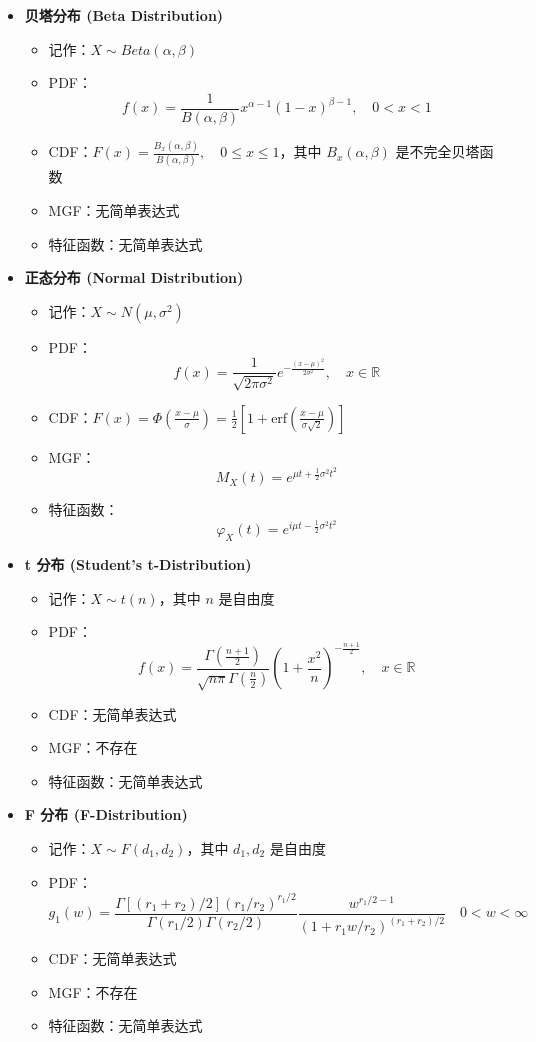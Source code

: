 \begin{itemize}
    \item \textbf{贝塔分布 (Beta Distribution)}
    \begin{itemize}
        \item 记作：$X \sim Beta(\alpha, \beta)$
        \item PDF：$$f(x) = \frac{1}{B(\alpha, \beta)} x^{\alpha-1} (1-x)^{\beta-1}, \quad 0 < x < 1$$
        \item CDF：$F(x) = \frac{B_x(\alpha, \beta)}{B(\alpha, \beta)}, \quad 0 \leq x \leq 1$，其中 $B_x(\alpha, \beta)$ 是不完全贝塔函数
        \item MGF：无简单表达式
        \item 特征函数：无简单表达式
    \end{itemize}

    \item \textbf{正态分布 (Normal Distribution)}
    \begin{itemize}
        \item 记作：$X \sim N(\mu, \sigma^2)$
        \item PDF：$$f(x) = \frac{1}{\sqrt{2\pi\sigma^2}} e^{-\frac{(x-\mu)^2}{2\sigma^2}}, \quad x \in \mathbb{R}$$
        \item CDF：$F(x) = \Phi\left(\frac{x-\mu}{\sigma}\right) = \frac{1}{2}\left[1 + \text{erf}\left(\frac{x-\mu}{\sigma\sqrt{2}}\right)\right]$
        \item MGF：$$M_X(t) = e^{\mu t + \frac{1}{2}\sigma^2 t^2}$$
        \item 特征函数：$$\varphi_X(t) = e^{i\mu t - \frac{1}{2}\sigma^2 t^2}$$
    \end{itemize}

    \item \textbf{t 分布 (Student's t-Distribution)}
    \begin{itemize}
        \item 记作：$X \sim t(n)$，其中 $n$ 是自由度
        \item PDF：$$f(x) = \frac{\Gamma(\frac{n+1}{2})}{\sqrt{n\pi}\Gamma(\frac{n}{2})}\left(1+\frac{x^2}{n}\right)^{-\frac{n+1}{2}}, \quad x \in \mathbb{R}$$
        \item CDF：无简单表达式
        \item MGF：不存在
        \item 特征函数：无简单表达式
    \end{itemize}

    \item \textbf{F 分布 (F-Distribution)}
    \begin{itemize}
        \item 记作：$X \sim F(d_1, d_2)$，其中 $d_1, d_2$ 是自由度
        \item PDF：$$g_1(w)=\frac{\Gamma\left[\left(r_1+r_2\right) / 2\right]\left(r_1 / r_2\right)^{r_1 / 2}}{\Gamma\left(r_1 / 2\right) \Gamma\left(r_2 / 2\right)} \frac{w^{r_1 / 2-1}}{\left(1+r_1 w / r_2\right)^{\left(r_1+r_2\right) / 2}} \quad 0<w<\infty$$
        \item CDF：无简单表达式
        \item MGF：不存在
        \item 特征函数：无简单表达式
    \end{itemize}
\end{itemize}
